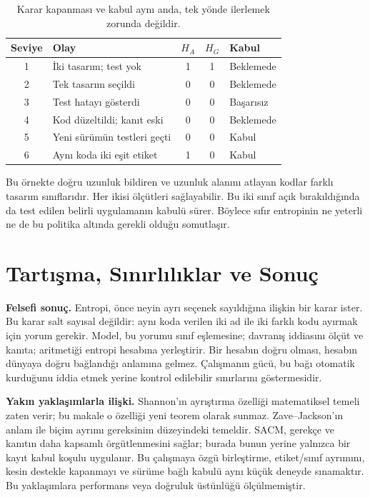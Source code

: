 \documentclass[runningheads]{llncs}
\begin{document}
\begin{table}[t]
\caption{Karar kapanması ve kabul aynı anda, tek yönde ilerlemek zorunda değildir.}\label{tab:flow}
\centering\small\setlength{\tabcolsep}{4pt}
\begin{tabular}{cp{}ccp{}}
\toprule Seviye & Olay & $H_A$ & $H_G$ & Kabul\\\midrule
1 & İki tasarım; test yok & 1 & 1 & Beklemede\\
2 & Tek tasarım seçildi & 0 & 0 & Beklemede\\
3 & Test hatayı gösterdi & 0 & 0 & Başarısız\\
4 & Kod düzeltildi; kanıt eski & 0 & 0 & Beklemede\\
5 & Yeni sürümün testleri geçti & 0 & 0 & Kabul\\
6 & Aynı koda iki eşit etiket & 1 & 0 & Kabul\\\bottomrule
\end{tabular}
\end{table}

Bu örnekte doğru uzunluk bildiren ve uzunluk alanını atlayan kodlar farklı tasarım sınıflarıdır. Her ikisi ölçütleri sağlayabilir. Bu iki sınıf açık bırakıldığında da test edilen belirli uygulamanın kabulü sürer. Böylece sıfır entropinin ne yeterli ne de bu politika altında gerekli olduğu somutlaşır.

\section{Tartışma, Sınırlılıklar ve Sonuç}
\textbf{Felsefi sonuç.} Entropi, önce neyin ayrı seçenek sayıldığına ilişkin bir karar ister. Bu karar salt sayısal değildir: aynı koda verilen iki ad ile iki farklı kodu ayırmak için yorum gerekir. Model, bu yorumu sınıf eşlemesine; davranış iddiasını ölçüt ve kanıta; aritmetiği entropi hesabına yerleştirir. Bir hesabın doğru olması, hesabın dünyaya doğru bağlandığı anlamına gelmez. Çalışmanın gücü, bu bağı otomatik kurduğunu iddia etmek yerine kontrol edilebilir sınırlarını göstermesidir.

\textbf{Yakın yaklaşımlarla ilişki.} Shannon'ın ayrıştırma özelliği matematiksel temeli zaten verir; bu makale o özelliği yeni teorem olarak sunmaz. Zave--Jackson'ın anlam ile biçim ayrımı gereksinim düzeyindeki temeldir. SACM, gerekçe ve kanıtın daha kapsamlı örgütlenmesini sağlar; burada bunun yerine yalnızca bir kayıt kabul koşulu uygulanır. Bu çalışmaya özgü birleştirme, etiket/sınıf ayrımını, kesin destekle kapanmayı ve sürüme bağlı kabulü aynı küçük deneyde sınamaktır. Bu yaklaşımlara performans veya doğruluk üstünlüğü ölçülmemiştir.
\end{document}
